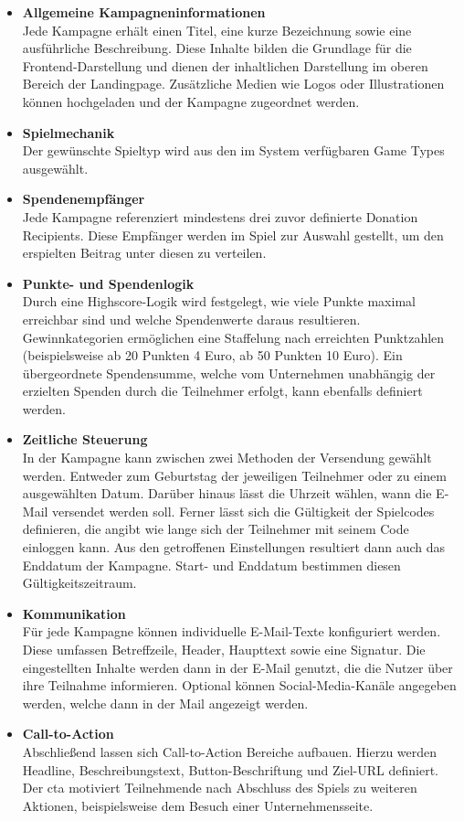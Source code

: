 \begin{itemize}
\item \textbf{Allgemeine Kampagneninformationen} \\
Jede Kampagne erhält einen Titel, eine kurze Bezeichnung sowie eine ausführliche Beschreibung.
Diese Inhalte bilden die Grundlage für die Frontend-Darstellung und dienen der inhaltlichen Darstellung im oberen Bereich der Landingpage.
Zusätzliche Medien wie Logos oder Illustrationen können hochgeladen und der Kampagne zugeordnet werden.

\item \textbf{Spielmechanik} \\
Der gewünschte Spieltyp wird aus den im System verfügbaren Game Types ausgewählt.

\item \textbf{Spendenempfänger} \\
Jede Kampagne referenziert mindestens drei zuvor definierte Donation Recipients.
Diese Empfänger werden im Spiel zur Auswahl gestellt, um den erspielten Beitrag unter diesen zu verteilen.

\item \textbf{Punkte- und Spendenlogik} \\
Durch eine Highscore-Logik wird festgelegt, wie viele Punkte maximal erreichbar sind und welche Spendenwerte daraus resultieren.
Gewinnkategorien ermöglichen eine Staffelung nach erreichten Punktzahlen (beispielsweise ab 20 Punkten 4 Euro, ab 50 Punkten 10 Euro).
Ein übergeordnete Spendensumme, welche vom Unternehmen unabhängig der erzielten Spenden durch die Teilnehmer erfolgt, kann ebenfalls definiert werden.

\item \textbf{Zeitliche Steuerung} \\
In der Kampagne kann zwischen zwei Methoden der Versendung gewählt werden.
Entweder zum Geburtstag der jeweiligen Teilnehmer oder zu einem ausgewählten Datum.
Darüber hinaus lässt die Uhrzeit wählen, wann die E-Mail versendet werden soll.
Ferner lässt sich die Gültigkeit der Spielcodes definieren, die angibt wie lange sich der Teilnehmer mit seinem Code einloggen kann.
Aus den getroffenen Einstellungen resultiert dann auch das Enddatum der Kampagne.
Start- und Enddatum bestimmen diesen Gültigkeitszeitraum.

\item \textbf{Kommunikation} \\
Für jede Kampagne können individuelle E-Mail-Texte konfiguriert werden.
Diese umfassen Betreffzeile, Header, Haupttext sowie eine Signatur.
Die eingestellten Inhalte werden dann in der E-Mail genutzt, die die Nutzer über ihre Teilnahme informieren.
Optional können Social-Media-Kanäle angegeben werden, welche dann in der Mail angezeigt werden.

\item \textbf{Call-to-Action} \\
Abschließend lassen sich Call-to-Action Bereiche aufbauen. Hierzu werden Headline, Beschreibungstext, Button-Beschriftung und Ziel-URL definiert.
Der \gls{cta} motiviert Teilnehmende nach Abschluss des Spiels zu weiteren Aktionen, beispielsweise dem Besuch einer Unternehmensseite.
\end{itemize}

